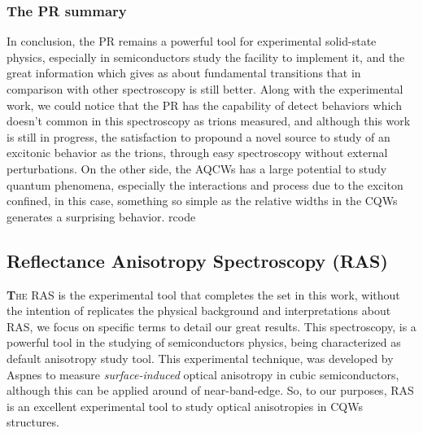  \subsubsection{The PR summary}
 \label{subsubsec:chapter-3-ps-conclusions}
 \vspace{-10mm}
 In conclusion, the PR remains a powerful tool for experimental solid-state physics, especially in semiconductors study the facility to implement it, and the great information which gives as about fundamental transitions that in comparison with other spectroscopy is still better. Along with the experimental work, we could notice that the PR has the capability of detect behaviors which doesn't common in this spectroscopy as trions measured, and although this work is still in progress, the satisfaction to propound a novel source to study of an excitonic behavior as the trions,  through easy spectroscopy without external perturbations.  On the other side, the AQCWs has a large potential to study quantum phenomena, especially the interactions and process due to the exciton confined, in this case, something so simple as the relative widths in the CQWs generates a surprising behavior. 
rcode 
\subsection{Reflectance Anisotropy Spectroscopy (RAS)}
\label{subsec:chapter-3-ras}
 \vspace{-10mm}
\lettrine[lines=3, lraise=.1, nindent=0mm, slope=0mm]{\textbf{T}}{he RAS} is the experimental tool that completes the set in this work, without the intention of replicates the physical background and interpretations about RAS, we focus on specific terms to detail our great results.  This spectroscopy, is a  powerful tool in the studying of semiconductors physics, being characterized as default anisotropy study tool.  This experimental technique, was developed by Aspnes\cite{aspnes1973surface,aspnes1985anisotropies, aspnes1985above} to measure \emph{surface-induced} optical anisotropy in cubic semiconductors, although this can be applied around of near-band-edge\cite{wei1995theory}. So, to our purposes, RAS is an excellent experimental tool to study optical anisotropies in CQWs structures. 


